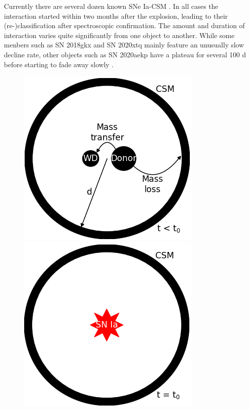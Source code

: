 \documentclass[a4paper,oneside,12pt, class=Latex/Classes/PhDthesisPSnPDF, crop=false]{standalone}
\begin{document}
Currently there are several dozen known SNe Ia-CSM \citep{2005gj, Ia-CSM_Silverman, Ia-CSM_BTS}. In all cases the interaction started within two months after the explosion, leading to their (re-)classification after spectroscopic confirmation. The amount and duration of interaction varies quite significantly from one object to another. While some menbers such as SN 2018gkx and SN 2020xtq mainly feature an unusually slow decline rate, other objects such as SN 2020aekp have a plateau for several 100 d before starting to fade away slowly \citep{Ia-CSM_BTS}.

\begin{figure}
    \centering
    \includegraphics[height=0.281\textheight]{../Images/chapter_1/CSM_sketch_1.png}\\
    \includegraphics[height=0.281\textheight]{../Images/chapter_1/CSM_sketch_2.png}\\

\end{figure}
\end{document}
